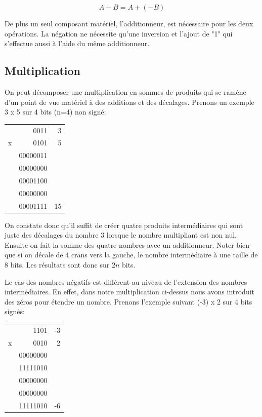 \begin{equation}
A - B = A + (-B)
\end{equation}

De plus un seul composant matériel, l'additionneur, est nécessaire pour les deux opérations. La négation ne nécessite qu'une inversion et l'ajout de "1" qui s'effectue aussi à l'aide du même additionneur.

\subsection{Multiplication}
On peut décomposer une multiplication en sommes de produits qui se ramène d'un point de vue matériel à des additions et des décalages. Prenons un exemple 3 x 5 sur 4 bits (n=4) non signé:

\begin{center}
{\selectfont
\begin{tabular}{c r r}
  & 0011 & 3 \\
x & 0101 & 5 \\
\hline
& 00000011 \\
& 00000000 \\
& 00001100 \\
& 00000000 \\
\hline
& 00001111 & 15 \\
\end{tabular}
}
\end{center}

On constate donc qu'il suffit de créer quatre produits intermédiaires qui sont juste des décalages du nombre 3 lorsque le nombre multipliant est non nul. Ensuite on fait la somme des quatre nombres avec un additionneur. Noter bien que si on décale de 4 crans vers la gauche, le nombre intermédiaire à une taille de 8 bits. Les résultats sont donc sur $2n$ bits.

Le cas des nombres négatifs est différent au niveau de l'extension des nombres intermédiaires. En effet, dans notre multiplication ci-dessus nous avons introduit des zéros pour étendre un nombre. Prenons l'exemple suivant (-3) x 2 sur 4 bits signés:

\begin{center}
{\selectfont
\begin{tabular}{c r r}
  & 1101 & -3 \\
x & 0010 & 2 \\
\hline
& 00000000 \\
& 11111010 \\
& 00000000 \\
& 00000000 \\
\hline
& 11111010 & -6\\
\end{tabular}
}
\end{center}

